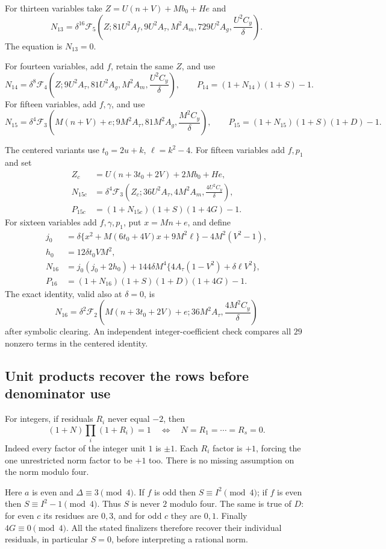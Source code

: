 For thirteen variables take $Z=U(n+V)+Mb_0+He$ and
\[
 N_{13}=\delta^{16}\mathcal F_5\left(
 Z;81U^2A_f,9U^2A_\tau,M^2A_m,729U^2A_g,
 \frac{U^2C_y}{\delta}\right).
\]
The equation is $N_{13}=0$.

For fourteen variables, add $f$, retain the same $Z$, and use
\[
 N_{14}=\delta^8\mathcal F_4\left(
 Z;9U^2A_\tau,81U^2A_g,M^2A_m,
 \frac{U^2C_y}{\delta}\right),\qquad
 P_{14}=(1+N_{14})(1+S)-1.
\]
For fifteen variables, add $f,\gamma$, and use
\[
 N_{15}=\delta^4\mathcal F_3\left(
 M(n+V)+e;9M^2A_\tau,81M^2A_g,
 \frac{M^2C_y}{\delta}\right),
 \qquad P_{15}=(1+N_{15})(1+S)(1+D)-1.
\]

The centered variants use $t_0=2u+k$, $\ell=k^2-4$.
For fifteen variables add $f,p_1$ and set
\begin{align*}
 Z_c&=U(n+3t_0+2V)+2Mb_0+He,\\
 N_{15c}&=\delta^4\mathcal F_3\left(
 Z_c;36U^2A_\tau,4M^2A_m,\frac{4U^2C_y}{\delta}\right),\\
 P_{15c}&=(1+N_{15c})(1+S)(1+4G)-1.
\end{align*}
For sixteen variables add $f,\gamma,p_1$, put $x=Mn+e$, and define
\begin{align*}
 j_0&=\delta\{x^2+M(6t_0+4V)x+9M^2\ell\}
       -4M^2(V^2-1),\\
 h_0&=12\delta t_0VM^2,\\
 N_{16}&=j_0(j_0+2h_0)
  +144\delta M^4\{4A_\tau(1-V^2)+\delta\ell V^2\},\\
 P_{16}&=(1+N_{16})(1+S)(1+D)(1+4G)-1.
\end{align*}
The exact identity, valid also at $\delta=0$, is
\[
 N_{16}=\delta^2\mathcal F_2\left(
 M(n+3t_0+2V)+e;36M^2A_\tau,
 \frac{4M^2C_y}{\delta}\right)
\]
after symbolic clearing. An independent integer-coefficient check compares
all $29$ nonzero terms in the centered identity.

\subsection{Unit products recover the rows before denominator use}
For integers, if residuals $R_i$ never equal $-2$, then
\[
 (1+N)\prod_i(1+R_i)=1
 \quad\Longleftrightarrow\quad N=R_1=\cdots=R_s=0.
\]
Indeed every factor of the integer unit $1$ is $\pm1$. Each $R_i$ factor
is $+1$, forcing the one unrestricted norm factor to be $+1$ too.
There is no missing assumption on the norm modulo four.

Here $a$ is even and $\Delta\equiv3\pmod4$. If $f$ is odd then
$S\equiv I^2\pmod4$; if $f$ is even then $S\equiv I^2-1\pmod4$.
Thus $S$ is never $2$ modulo four. The same is true of $D$: for even $c$
its residues are $0,3$, and for odd $c$ they are $0,1$.
Finally $4G\equiv0\pmod4$. All the stated finalizers therefore recover
their individual residuals, in particular $S=0$, before interpreting a
rational norm.

